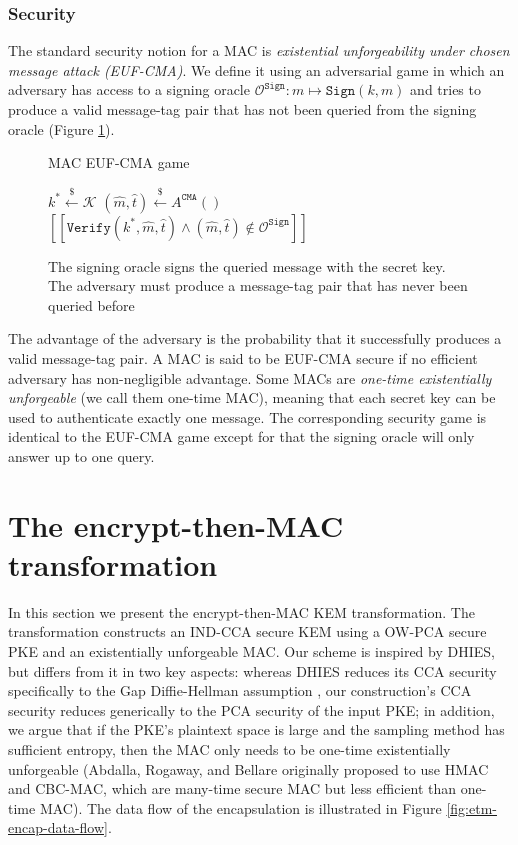 \documentclass[runningheads]{llncs}
\newcommand{\sign}{\texttt{Sign}}
\newcommand{\verify}{\texttt{Verify}}
\newcommand{\leftsample}{\stackrel{\$}{\leftarrow}}
\newcommand{\llbrack}{[\![}
\newcommand{\rrbrack}{]\!]}
\begin{document}
\subsubsection{Security} The standard security notion for a MAC is \textit{existential unforgeability under chosen message attack (EUF-CMA)}. We define it using an adversarial game in which an adversary has access to a signing oracle $\mathcal{O}^\sign: m \mapsto \sign(k, m)$ and tries to produce a valid message-tag pair that has not been queried from the signing oracle (Figure \ref{fig:euf-cma-game}).

\begin{figure}[h]
    \centering
    \begin{minipage}[t]{0.6\textwidth}
    \begin{algorithm}[H]
        \caption*{MAC EUF-CMA game}
        \begin{algorithmic}[1]
            \State $k^\ast \leftsample \mathcal{K}$
            \State $(\hat{m}, \hat{t}) \leftsample A^\texttt{CMA}()$
            \State \Return $\llbrack \verify(k^\ast, \hat{m}, \hat{t}) \land (\hat{m}, \hat{t}) \not\in \mathcal{O}^\sign \rrbrack$
        \end{algorithmic}
    \end{algorithm}
    \end{minipage}
    \caption{The signing oracle signs the queried message with the secret key. The adversary must produce a message-tag pair that has never been queried before}\label{fig:euf-cma-game}
\end{figure}

The advantage of the adversary is the probability that it successfully produces a valid message-tag pair. A MAC is said to be EUF-CMA secure if no efficient adversary has non-negligible advantage. Some MACs are \textit{one-time existentially unforgeable} (we call them one-time MAC), meaning that each secret key can be used to authenticate exactly one message. The corresponding security game is identical to the EUF-CMA game except for that the signing oracle will only answer up to one query.

\section{The encrypt-then-MAC transformation}\label{sec:the-enc-then-mac-transformation}
In this section we present the encrypt-then-MAC KEM transformation. The transformation constructs an IND-CCA secure KEM using a OW-PCA secure PKE and an existentially unforgeable MAC. Our scheme is inspired by DHIES, but differs from it in two key aspects: whereas DHIES reduces its CCA security specifically to the Gap Diffie-Hellman assumption \cite{DBLP:conf/pkc/OkamotoP01}, our construction's CCA security reduces generically to the PCA security of the input PKE; in addition, we argue that if the PKE's plaintext space is large and the sampling method has sufficient entropy, then the MAC only needs to be one-time existentially unforgeable (Abdalla, Rogaway, and Bellare originally proposed to use HMAC and CBC-MAC, which are many-time secure MAC but less efficient than one-time MAC). The data flow of the encapsulation is illustrated in Figure \ref{fig:etm-encap-data-flow}. 
\end{document}

